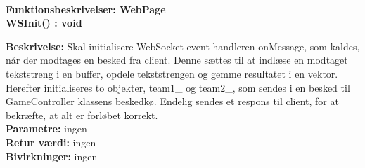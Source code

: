 \documentclass[Arkitektur/System_main.tex]{subfiles}
\begin{document}
\\
{\large\textbf{Funktionsbeskrivelser: WebPage}}\\[0.2cm]
\textbf{WSInit() : void}
\begin{adjustwidth}{1cm}{0pt}
\textbf{Beskrivelse:} Skal initialisere WebSocket event handleren onMessage, som kaldes, når der modtages en besked fra client. Denne sættes til at indlæse en modtaget tekststreng i en buffer, opdele tekststrengen og gemme resultatet i en vektor. Herefter initialiseres to objekter, team1\_ og team2\_, som sendes i en besked til GameController klassens beskedkø. Endelig sendes et respons til client, for at bekræfte, at alt er forløbet korrekt.\\
\textbf{Parametre:} ingen \\[0.2cm]
\textbf{Retur værdi:} ingen \\[0.2cm]
\textbf{Bivirkninger:} ingen \\[0.2cm]
\end{adjustwidth}
\end{document}

